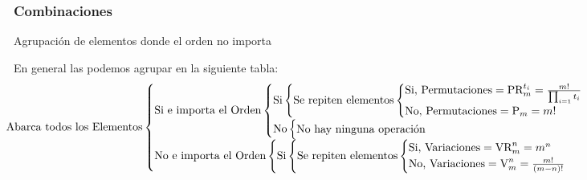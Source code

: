 \subsubsection{Combinaciones}
 Agrupación de elementos donde el orden no importa
\par  En general las podemos agrupar en la siguiente tabla:
\[
        \hspace*{-2.5cm} \textnormal{Abarca todos los Elementos}
        \begin{cases}
                \textnormal{Si e importa el Orden}
                \begin{cases}
                        \textnormal{Si}
                        \begin{cases}
                                \textnormal{Se repiten elementos}
                                \begin{cases}
                                        \textnormal{Si, Permutaciones} = \textnormal{PR}^{t_i}_{m} = \frac{m!}{\prod_{i=1}t_i } \\
                                        \textnormal{No, Permutaciones} = \textnormal{P}_m = m!
                                \end{cases}
                        \end{cases}
                        \\
                        \textnormal{No}\begin{cases}
                                \textnormal{No hay ninguna operación}
                        \end{cases}
                \end{cases} \\
                \textnormal{No e importa el Orden}
                \begin{cases}
                        \textnormal{Si}
                        \begin{cases}
                                \textnormal{Se repiten elementos}
                                \begin{cases}
                                        \textnormal{Si, Variaciones} = \textnormal{VR}_m^n=m^n \\
                                        \textnormal{No, Variaciones} = \textnormal{V}^n_m = \frac{m!}{(m-n)!}
                                \end{cases}
                        \end{cases}
                        \\

\end{cases}
\end{cases}\]
